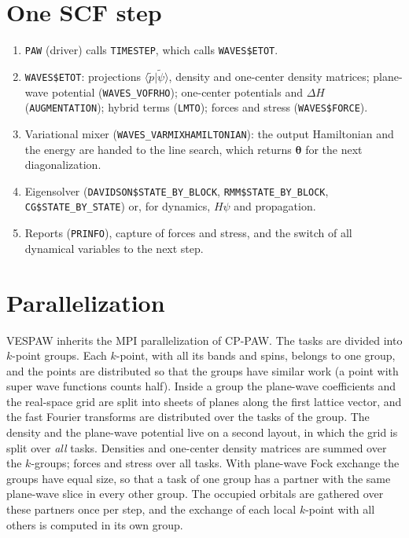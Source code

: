\documentclass[11pt,a4paper,oneside]{book}
\newcommand{\vth}{\bm\theta}
\newcommand{\braket}[2]{\langle #1|#2\rangle}
\newcommand{\pt}{\tilde p}
\begin{document}
\section{One SCF step}

\begin{enumerate}
\item \texttt{PAW} (driver) calls \texttt{TIMESTEP}, which calls
  \texttt{WAVES\$ETOT}.
\item \texttt{WAVES\$ETOT}: projections $\braket{\pt}{\tilde\psi}$, density
  and one-center density matrices; plane-wave potential
  (\texttt{WAVES\_VOFRHO}); one-center potentials and $\Delta H$
  (\texttt{AUGMENTATION}); hybrid terms (\texttt{LMTO}); forces and
  stress (\texttt{WAVES\$FORCE}).
\item Variational mixer (\texttt{WAVES\_VARMIXHAMILTONIAN}): the output
  Hamiltonian and the energy are handed to the line search, which returns
  $\vth$ for the next diagonalization.
\item Eigensolver (\texttt{DAVIDSON\$STATE\_BY\_BLOCK},
  \texttt{RMM\$STATE\_BY\_BLOCK}, \texttt{CG\$STATE\_BY\_STATE}) or, for
  dynamics, $H\psi$ and propagation.
\item Reports (\texttt{PRINFO}), capture of forces and stress, and the
  switch of all dynamical variables to the next step.
\end{enumerate}

\section{Parallelization}\label{sec:mpi}

VESPAW inherits the MPI parallelization of CP-PAW. The tasks are divided
into $k$-point groups. Each $k$-point, with all its bands and spins,
belongs to one group, and the points are distributed so that the groups
have similar work (a point with super wave functions counts half). Inside
a group the plane-wave coefficients and the real-space grid are split
into sheets of planes along the first lattice vector, and the fast Fourier
transforms are distributed over the tasks of the group. The density and
the plane-wave potential live on a second layout, in which the grid is
split over \emph{all} tasks. Densities and one-center density matrices are
summed over the $k$-groups; forces and stress over all tasks.
With plane-wave Fock exchange the groups have equal size, so that a
task of one group has a partner with the same plane-wave slice in every
other group. The occupied orbitals are gathered over these partners
once per step, and the exchange of each local $k$-point with all
others is computed in its own group.
\end{document}
